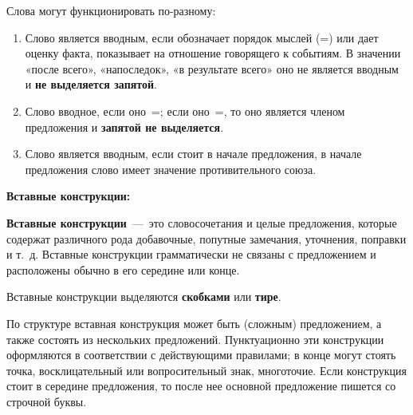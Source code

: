 \documentclass[main]{subfile}
\begin{document}
Слова  могут функционировать по-разному:

\begin{enumerate}
      \item Слово  является вводным, если обозначает порядок мыслей (=) или дает оценку факта, показывает на отношение говорящего к событиям.
            В значении «после всего», «напоследок», «в результате всего» оно не является вводным и \textbf{не выделяется запятой}. \newline
      \item Слово  вводное, если оно =; если оно =, то оно является членом предложения и \textbf{запятой не выделяется}. \newline
      \item Слово  является вводным, если стоит в начале предложения, в начале предложения слово  имеет значение противительного союза. \newline
\end{enumerate}

\textbf{Вставные конструкции:}

\textbf{Вставные конструкции} --- это словосочетания и целые предложения, которые содержат различного рода добавочные, попутные замечания, уточнения, поправки и т. д.
Вставные конструкции грамматически не связаны с предложением и расположены обычно в его середине или конце.

Вставные конструкции выделяются \textbf{скобками} или \textbf{тире}.

По структуре вставная конструкция может быть (сложным) предложением, а также состоять из нескольких предложений.
Пунктуационно эти конструкции оформляются в соответствии с действующими правилами; в конце могут стоять точка, восклицательный или вопросительный знак, многоточие.
Если конструкция стоит в середине предложения, то после нее основной предложение пишется со строчной буквы.

\end{document}

